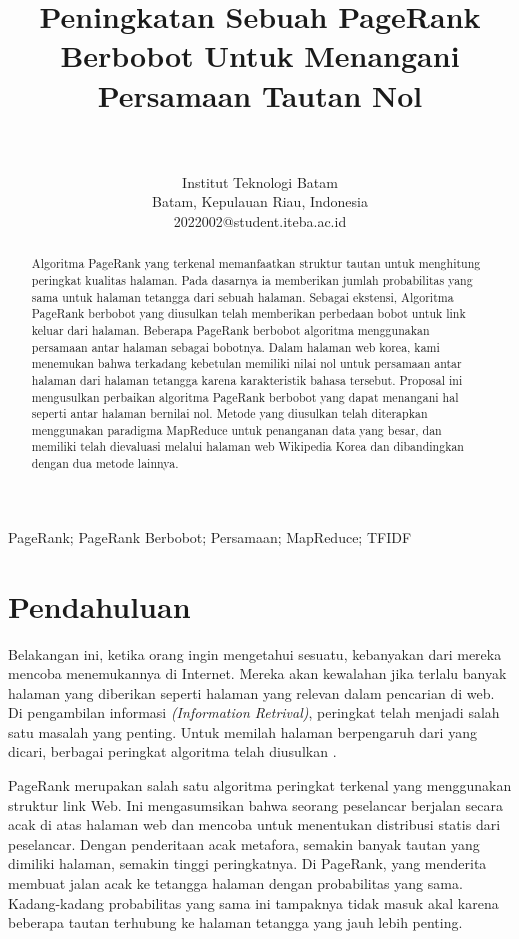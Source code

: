 \documentclass[conference]{IEEEtran}
\title{\textbf{Peningkatan Sebuah PageRank Berbobot Untuk Menangani Persamaan Tautan Nol}}
\author{\IEEEauthorblockN{Jeremy Andika}\\
\IEEEauthorblockA{Fakultas Teknologi Informasi}\\
Institut Teknologi Batam\\
Batam, Kepulauan Riau, Indonesia\\
2022002@student.iteba.ac.id}
\begin{document}
\maketitle

\begin{abstract}

    Algoritma PageRank yang terkenal memanfaatkan
struktur tautan untuk menghitung peringkat kualitas halaman. Pada dasarnya ia memberikan jumlah probabilitas yang sama untuk halaman tetangga dari sebuah halaman. Sebagai ekstensi, Algoritma PageRank berbobot yang diusulkan telah memberikan perbedaan bobot untuk link keluar dari halaman. Beberapa PageRank berbobot algoritma menggunakan persamaan antar halaman sebagai bobotnya. Dalam halaman web korea, kami menemukan bahwa terkadang kebetulan memiliki nilai nol untuk persamaan antar halaman dari halaman tetangga karena karakteristik bahasa tersebut. Proposal ini mengusulkan perbaikan algoritma PageRank berbobot yang dapat menangani hal seperti antar halaman bernilai nol. Metode yang diusulkan telah diterapkan menggunakan paradigma MapReduce untuk penanganan data yang besar, dan memiliki telah dievaluasi melalui halaman web Wikipedia Korea dan dibandingkan dengan dua metode lainnya.
\end{abstract}

\begin{IEEEkeywords}
    PageRank; PageRank Berbobot; Persamaan; MapReduce; TFIDF
\end{IEEEkeywords}

\section{Pendahuluan}

Belakangan ini, ketika orang ingin mengetahui sesuatu, kebanyakan dari mereka mencoba menemukannya di Internet. Mereka akan kewalahan jika terlalu banyak halaman yang diberikan seperti halaman yang relevan dalam pencarian di web. Di pengambilan informasi \textit{(Information Retrival)}, peringkat telah menjadi salah satu masalah yang penting. Untuk memilah halaman berpengaruh dari yang dicari, berbagai peringkat algoritma telah diusulkan \cite{brin1998anatomy, xing2004weighted, qiao2010simrank, page1999pagerank, kumar2013pagerank, duhan2009page, najork2007comparing, kumar2011page, nemirovsky2008weighted, tyagi2012weighted, haveliwala2003topic}.

PageRank\cite{brin1998anatomy} merupakan salah satu algoritma peringkat terkenal yang menggunakan struktur link Web. Ini mengasumsikan bahwa seorang peselancar berjalan secara acak di atas halaman web dan mencoba untuk menentukan distribusi statis dari peselancar. Dengan penderitaan acak metafora, semakin banyak tautan yang dimiliki halaman, semakin tinggi peringkatnya. Di PageRank, yang menderita membuat jalan acak ke tetangga halaman dengan probabilitas yang sama. Kadang-kadang probabilitas yang sama ini tampaknya tidak masuk akal karena beberapa tautan terhubung ke halaman tetangga yang jauh lebih penting.
\end{document}
